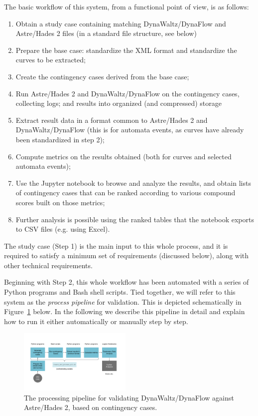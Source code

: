 \documentclass[conference]{IEEEtran}
\begin{document}

The basic workflow of this system, from a functional point of view, is
as follows:
\begin{enumerate}
  \item Obtain a study case containing matching DynaWaltz/DynaFlow and Astre/Hades 2 files
        (in a standard file structure, see below)
  \item Prepare the base case: standardize the XML format and
        standardize the curves to be extracted;
  \item Create the contingency cases derived from the base case;
  \item Run Astre/Hades 2 and DynaWaltz/DynaFlow on the contingency cases, collecting logs;
        and results into organized (and compressed) storage
  \item Extract result data in a format common to Astre/Hades 2 and DynaWaltz/DynaFlow
        (this is for automata events, as curves have already been
        standardized in step 2);
  \item Compute metrics on the results obtained (both for curves and
        selected automata events);
  \item Use the Jupyter notebook to browse and analyze the results,
        and obtain lists of contingency cases that can be ranked according
        to various compound scores built on those metrics;
  \item Further analysis is possible using the ranked tables that the
        notebook exports to CSV files (e.g. using Excel).
\end{enumerate}

The study case (Step 1) is the main input to this whole process, and it is
required to satisfy a minimum set of requirements (discussed below), along with
other technical requirements.

Beginning with Step 2, this whole workflow has been automated with a series of
Python programs and Bash shell scripts. Tied together, we will refer to this
system as the \emph{process pipeline} for validation. This is depicted
schematically in Figure~\ref{fig:pipeline1} below.  In the following we describe
this pipeline in detail and explain how to run it either automatically or
manually step by step.

\begin{figure}
  \centering
  \includegraphics[width=0.48\textwidth]{figs/pipeline1}
  \caption{The processing pipeline for validating DynaWaltz/DynaFlow against
    Astre/Hades 2, based on contingency cases.}
  \label{fig:pipeline1}
\end{figure}
\end{document}

